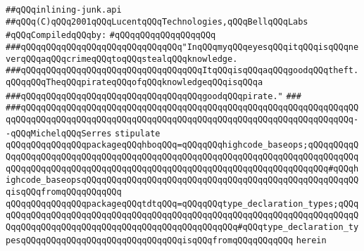 \label{src/lib/compiler/front/semantic/basics/inlining-junk.api}
\verb|##qQQqinlining-junk.api|\newline
\verb|##qQQq(C)qQQq2001qQQqLucentqQQqTechnologies,qQQqBellqQQqLabs|\newline
\newline
\verb|#qQQqCompiledqQQqby:|\newline
\verb|#qQQqqQQqqQQqqQQqqQQq|\newline
\newline
\newline
\newline
\verb|###qQQqqQQqqQQqqQQqqQQqqQQqqQQqqQQq"InqQQqmyqQQqeyesqQQqitqQQqisqQQqneverqQQqaqQQqcrimeqQQqtoqQQqstealqQQqknowledge.|\newline
\verb|###qQQqqQQqqQQqqQQqqQQqqQQqqQQqqQQqqQQqItqQQqisqQQqaqQQqgoodqQQqtheft.qQQqqQQqTheqQQqpirateqQQqofqQQqknowledgeqQQqisqQQqa|\newline
\verb|###qQQqqQQqqQQqqQQqqQQqqQQqqQQqqQQqqQQqgoodqQQqpirate."|\newline
\verb|###|\newline
\verb|###qQQqqQQqqQQqqQQqqQQqqQQqqQQqqQQqqQQqqQQqqQQqqQQqqQQqqQQqqQQqqQQqqQQqqQQqqQQqqQQqqQQqqQQqqQQqqQQqqQQqqQQqqQQqqQQqqQQqqQQqqQQqqQQqqQQqqQQq--qQQqMichelqQQqSerres|\newline
\newline
\newline
\newline
\verb|stipulate|\newline
\verb|qQQqqQQqqQQqqQQqpackageqQQqhboqQQq=qQQqqQQqhighcode_baseops;qQQqqQQqqQQqqQQqqQQqqQQqqQQqqQQqqQQqqQQqqQQqqQQqqQQqqQQqqQQqqQQqqQQqqQQqqQQqqQQqqQQqqQQqqQQqqQQqqQQqqQQqqQQqqQQqqQQqqQQqqQQqqQQqqQQqqQQqqQQqqQQq#qQQqhighcode_baseopsqQQqqQQqqQQqqQQqqQQqqQQqqQQqqQQqqQQqqQQqqQQqqQQqqQQqqQQqisqQQqfromqQQqqQQqqQQq|\newline
\verb|qQQqqQQqqQQqqQQqpackageqQQqtdtqQQq=qQQqqQQqtype_declaration_types;qQQqqQQqqQQqqQQqqQQqqQQqqQQqqQQqqQQqqQQqqQQqqQQqqQQqqQQqqQQqqQQqqQQqqQQqqQQqqQQqqQQqqQQqqQQqqQQqqQQqqQQqqQQqqQQqqQQqqQQq#qQQqtype_declaration_typesqQQqqQQqqQQqqQQqqQQqqQQqqQQqqQQqisqQQqfromqQQqqQQqqQQq|\newline
\verb|herein|\newline
